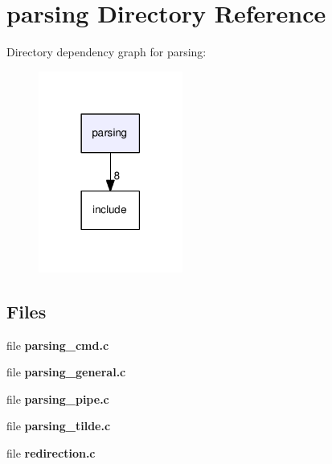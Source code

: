 \section{parsing Directory Reference}
\label{dir_643e863c297e14dce1d35446f03b11d2}
Directory dependency graph for parsing\-:
\nopagebreak
\begin{figure}[H]
\begin{center}
\leavevmode
\includegraphics[width=134pt]{dir_643e863c297e14dce1d35446f03b11d2_dep}
\end{center}
\end{figure}
\subsection*{Files}
\begin{DoxyCompactItemize}
\item 
file {\bf parsing\-\_\-cmd.\-c}
\item 
file {\bf parsing\-\_\-general.\-c}
\item 
file {\bf parsing\-\_\-pipe.\-c}
\item 
file {\bf parsing\-\_\-tilde.\-c}
\item 
file {\bf redirection.\-c}
\end{DoxyCompactItemize}
